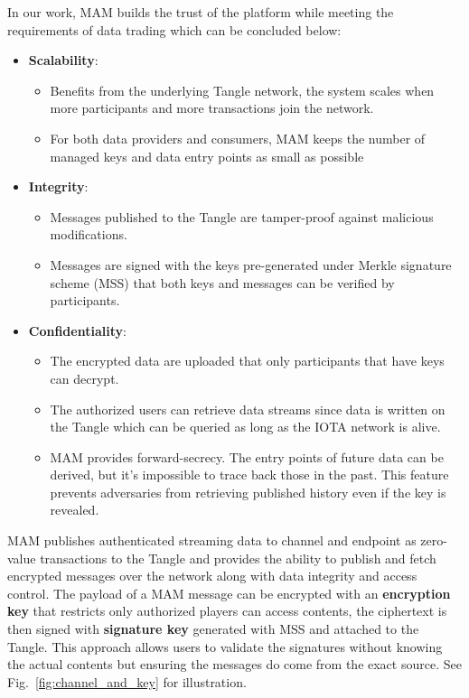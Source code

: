 \begin{spacing}{2.0}
In our work, MAM builds the trust of the platform while meeting the requirements of data trading which can be concluded below:

\begin{itemize}
    \item \textbf{Scalability}:
    \begin{itemize}
        \item Benefits from the underlying Tangle network, the system scales when more participants and more transactions join the network.
        \item For both data providers and consumers, MAM keeps the number of managed keys and data entry points as small as possible
    \end{itemize}    
    \item \textbf{Integrity}:
    \begin{itemize}
        \item Messages published to the Tangle are tamper-proof against malicious modifications.
        \item Messages are signed with the keys pre-generated under Merkle signature scheme\cite{MSS} (MSS) that both keys and messages can be verified by participants.
    \end{itemize}
    \item \textbf{Confidentiality}:
    \begin{itemize}
        \item The encrypted data are uploaded that only participants that have keys can decrypt.
        \item The authorized users can retrieve data streams since data is written on the Tangle which can be queried as long as the IOTA network is alive.
        \item MAM provides forward-secrecy. The entry points of future data can be derived, but it's impossible to trace back those in the past. This feature prevents adversaries from retrieving published history even if the key is revealed.
    \end{itemize}
\end{itemize}

MAM publishes authenticated streaming data to channel and endpoint as zero-value transactions to the Tangle and provides the ability to publish and fetch encrypted messages over the network along with data integrity and access control. The payload of a MAM message can be encrypted with an \textbf{encryption key} that restricts only authorized players can access contents, the ciphertext is then signed with \textbf{signature key} generated with MSS and attached to the Tangle. This approach allows users to validate the signatures without knowing the actual contents but ensuring the messages do come from the exact source. See Fig.~\ref{fig:channel_and_key} for illustration.


\end{spacing}
